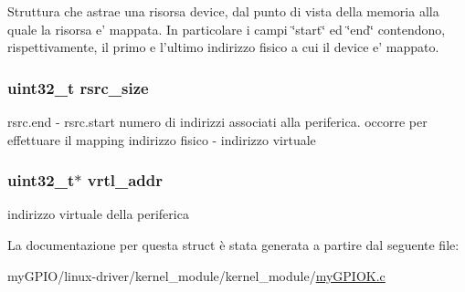 Struttura che astrae una risorsa device, dal punto di vista della memoria alla quale la risorsa e' mappata. In particolare i campi \char`\"{}start\char`\"{} ed \char`\"{}end\char`\"{} contendono, rispettivamente, il primo e l'ultimo indirizzo fisico a cui il device e' mappato. \hypertarget{structmy_g_p_i_o_k__t_a0f87b53dc5049a349ef01aa586c0b5dc}{
\subsubsection[{rsrc\+\_\+size}]{\setlength{\rightskip}{0pt plus 5cm}uint32\+\_\+t rsrc\+\_\+size}}\label{structmy_g_p_i_o_k__t_a0f87b53dc5049a349ef01aa586c0b5dc}
rsrc.\+end -\/ rsrc.\+start numero di indirizzi associati alla periferica. occorre per effettuare il mapping indirizzo fisico -\/ indirizzo virtuale \hypertarget{structmy_g_p_i_o_k__t_a7fb037ce37d63eb2c327ec952c74d2e9}{
\subsubsection[{vrtl\+\_\+addr}]{\setlength{\rightskip}{0pt plus 5cm}uint32\+\_\+t$\ast$ vrtl\+\_\+addr}}\label{structmy_g_p_i_o_k__t_a7fb037ce37d63eb2c327ec952c74d2e9}
indirizzo virtuale della periferica 

La documentazione per questa struct è stata generata a partire dal seguente file\+:\begin{DoxyCompactItemize}
\item 
my\+G\+P\+I\+O/linux-\/driver/kernel\+\_\+module/kernel\+\_\+module/\hyperlink{my_g_p_i_o_k_8c}{my\+G\+P\+I\+O\+K.\+c}\end{DoxyCompactItemize}
